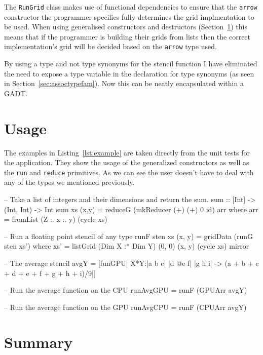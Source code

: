 \documentclass[
    12pt,
    a4paper,
    twoside,
    openright,
    ]{scrbook}
\begin{document}
The \texttt{RunGrid} class makes use of functional dependencies to ensure that
the \texttt{arrow} constructor the programmer specifies fully determines the
grid implmentation to be used. When using generalised constructors and
destructors (Section~\ref{sec:usage}) this means that if the programmer is
building their grids from lists then the correct implementation's grid will be
decided based on the \texttt{arrow} type used.

By using a type and not type synonyms for the stencil function I have eliminated
the need to expose a type variable in the declaration for type synonyms (as seen
in Section~\ref{sec:assoctypefam}). Now this can be neatly encapsulated within a
GADT.

\section{Usage}
\label{sec:usage}

The examples in Listing~\ref{lst:example} are taken directly from the unit tests
for the application. They show the usage of the generalized constructors as well
as the \texttt{run} and \texttt{reduce} primitives. As we can see the user
doesn't have to deal with any of the types we mentioned previously.

\begin{hflisting}[label=lst:example,
caption=Usage of the final system taken from the unit tests.]

-- Take a list of integers and their dimensions and return the sum.
sum :: [Int] -> (Int, Int) -> Int
sum xs (x,y) =  reduceG (mkReducer (+) (+) 0 id) arr
    where arr = fromList (Z :. x :. y) (cycle xs)

-- Run a floating point stencil of any type
runF sten xs (x, y) = gridData (runG sten xs')
    where xs' = listGrid (Dim X :* Dim Y)
                         (0, 0) (x, y)
                         (cycle xs)
                         mirror

-- The average stencil
avgY = [funGPU| X*Y:|a  b c|
                    |d @e f|
                    |g  h i| ->
        (a + b + c + d + e + f + g + h + i)/9|]

-- Run the average function on the CPU
runAvgGPU = runF (GPUArr avgY)

-- Run the average function on the GPU
runAvgCPU = runF (CPUArr avgY)

\end{hflisting}

\section{Summary}
\end{document}
